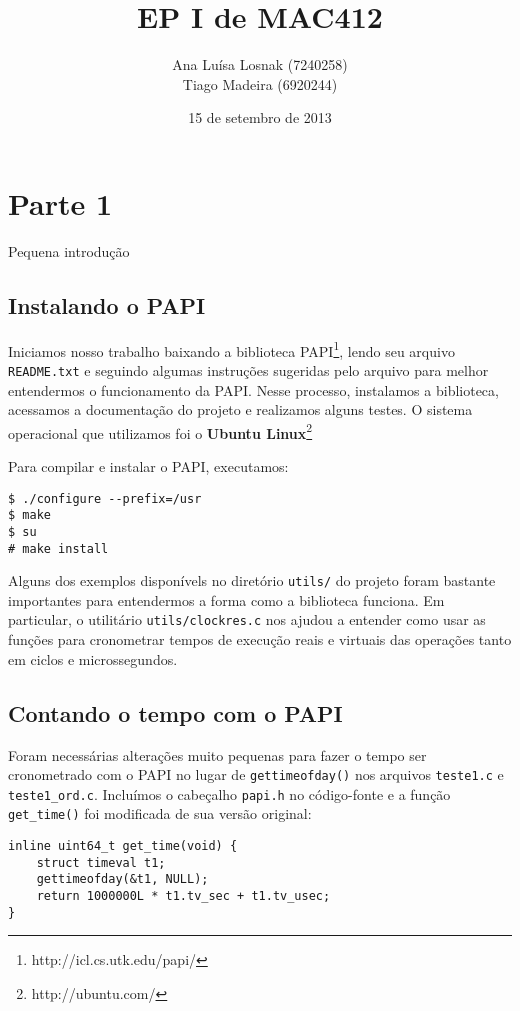 \documentclass[a4paper,oneside,12pt]{article}
\title{EP I de MAC412}
\author{Ana Luísa Losnak (7240258)\\
        Tiago Madeira (6920244)}
\date{15 de setembro de 2013}
\begin{document}
\maketitle
\tableofcontents
\newpage

\section{Parte 1}

Pequena introdução %

\subsection{Instalando o PAPI}

Iniciamos nosso trabalho baixando a biblioteca PAPI\footnote{http://icl.cs.utk.edu/papi/}, lendo seu arquivo {\tt README.txt} e seguindo algumas instruções sugeridas pelo arquivo para melhor entendermos o funcionamento da PAPI. Nesse processo, instalamos a biblioteca, acessamos a documentação do projeto e realizamos alguns testes. O sistema operacional que utilizamos foi o \textbf{Ubuntu Linux}\footnote{http://ubuntu.com/}

Para compilar e instalar o PAPI, executamos:

\begin{verbatim}
$ ./configure --prefix=/usr
$ make
$ su
# make install
\end{verbatim}

Alguns dos exemplos disponívels no diretório {\tt utils/} do projeto foram bastante importantes para entendermos a forma como a biblioteca funciona. Em particular, o utilitário {\tt utils/clockres.c} nos ajudou a entender como usar as funções para cronometrar tempos de execução reais e virtuais das operações tanto em ciclos e microssegundos.

\subsection{Contando o tempo com o PAPI}

Foram necessárias alterações muito pequenas para fazer o tempo ser cronometrado com o PAPI no lugar de {\tt gettimeofday()} nos arquivos {\tt teste1.c} e {\tt teste1\_ord.c}. Incluímos o cabeçalho {\tt papi.h} no código-fonte e a função {\tt get\_time()} foi modificada de sua versão original:

\begin{verbatim}
inline uint64_t get_time(void) {
    struct timeval t1;
    gettimeofday(&t1, NULL);
    return 1000000L * t1.tv_sec + t1.tv_usec;
}
\end{verbatim}
\end{document}

